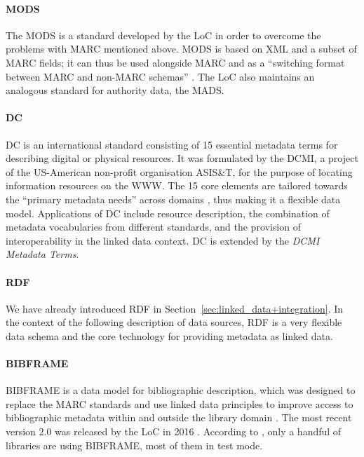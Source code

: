 \paragraph{MODS}

The \gls{MODS} is a standard developed by the \gls{LoC}
in order to overcome the problems with \gls{MARC} mentioned above.
MODS is based on \gls{XML} and a subset of MARC fields;
it can thus be used alongside MARC and as a \enquote{switching format
between MARC and non-MARC schemas} \autocite[p.219]{Hider2008}.
The LoC also maintains an analogous standard for authority data,
the \gls{MADS}.

\paragraph{DC}

\gls{DC} is an international standard consisting of 15 essential metadata terms
for describing digital or physical resources.
It was formulated by the \gls{DCMI}, a project of the US-American non-profit organisation
ASIS\&T, for the purpose of locating information resources on the \gls{WWW}.
The 15 core elements are tailored towards the \enquote{primary metadata needs} across domains
\autocite[p.215]{Hider2008}, thus making it a flexible data model.
Applications of \gls{DC} include resource description,
the combination of metadata vocabularies from different standards,
and the provision of interoperability in the linked data context.
\gls{DC} is extended by the \emph{DCMI Metadata Terms}.


\paragraph{RDF}

We have already introduced \gls{RDF} in Section~\ref{sec:linked_data+integration}.
In the context of the following description of data sources,
RDF is a very flexible data schema and the core technology for providing metadata as linked data.

\paragraph{BIBFRAME}

\gls{BIBFRAME} is a data model for bibliographic description,
which was designed to replace the \gls{MARC} standards and use linked data principles
to improve access to bibliographic metadata within and outside the library domain \autocite{WikiBIBFRAME}.
The most recent version 2.0 was released by the \gls{LoC} in 2016 \autocite{BIBFRAME}.
According to \cite{WikiBIBFRAME}, only a handful of libraries are using BIBFRAME,
most of them in test mode.

